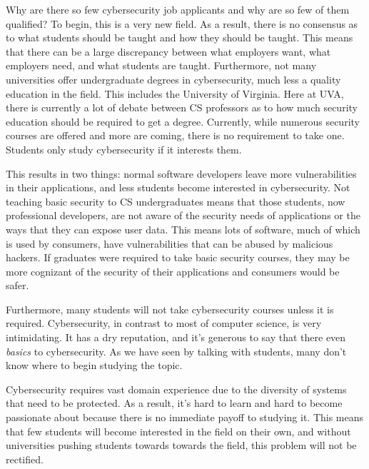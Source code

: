 \documentclass[openright]{report}
\begin{document}
\par Why are there so few cybersecurity job applicants and why are so few of them qualified? To begin, this is a very new field. As a result, there is no consensus as to what students should be taught and how they should be taught\cite{why_no_cyber_classes}. This means that there can be a large discrepancy between what employers want, what employers need, and what students are taught. Furthermore, not many universities offer undergraduate degrees in cybersecurity, much less a quality education in the field. This includes the University of Virginia. Here at UVA, there is currently a lot of debate between CS professors as to how much security education should be required to get a degree\cite{ibrahiminterview}. Currently, while numerous security courses are offered and more are coming, there is no requirement to take one\cite{comsci_handbook}. Students only study cybersecurity if it interests them.

\par This results in two things: normal software developers leave more vulnerabilities in their applications, and less students become interested in cybersecurity. Not teaching basic security to CS undergraduates means that those students, now professional developers, are not aware of the security needs of applications or the ways that they can expose user data. This means lots of software, much of which is used by consumers, have vulnerabilities that can be abused by malicious hackers\cite{why_no_cyber_classes}. If graduates were required to take basic security courses, they may be more cognizant of the security of their applications and consumers would be safer.

\par Furthermore, many students will not take cybersecurity courses unless it is required. Cybersecurity, in contrast to most of computer science, is very intimidating. It has a dry reputation, and it's generous to say that there even \textit{basics} to cybersecurity. As we have seen by talking with students, many don't know where to begin studying the topic. 

\par Cybersecurity requires vast domain experience due to the diversity of systems that need to be protected. As a result, it's hard to learn and hard to become passionate about because there is no immediate payoff to studying it. This means that few students will become interested in the field on their own, and without universities pushing students towards towards the field, this problem will not be rectified.
\end{document}
